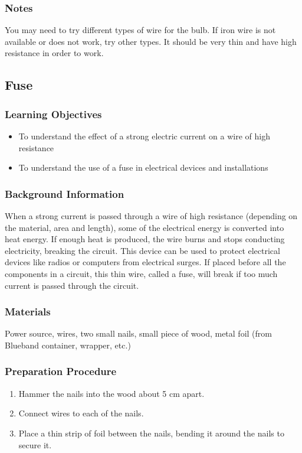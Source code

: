 \subsubsection*{Notes}
You may need to try different types of wire for the bulb.  If iron wire is not available or does not work, try other types.  It should be very thin and have high resistance in order to work.

\subsection{Fuse}

\subsubsection*{Learning Objectives}
\begin{itemize}
\item{To understand the effect of a strong electric current on a wire of high resistance}
\item{To understand the use of a fuse in electrical devices and installations}
\end{itemize}

\subsubsection*{Background Information}
When a strong current is passed through a wire of high resistance (depending on the material, area and length), some of the electrical energy is converted into heat energy.  If enough heat is produced, the wire burns and stops conducting electricity, breaking the circuit.  This device can be used to protect electrical devices like radios or computers from electrical surges.  If placed before all the components in a circuit, this thin wire, called a fuse, will break if too much current is passed through the circuit.

\subsubsection*{Materials}
Power source, wires, two small nails, small piece of wood, metal foil (from Blueband container, wrapper, etc.)

\subsubsection*{Preparation Procedure}
\begin{enumerate}
\item{Hammer the nails into the wood about 5 cm apart.}
\item{Connect wires to each of the nails.}
\item{Place a thin strip of foil between the nails, bending it around the nails to secure it.}
\end{enumerate}

